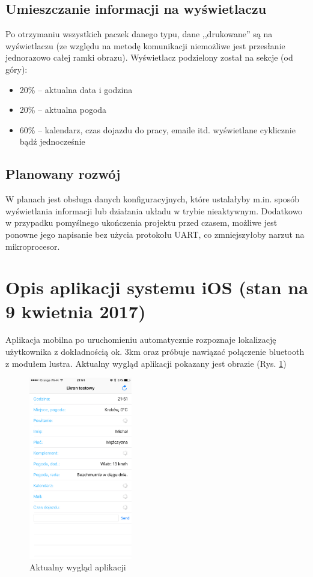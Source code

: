 \documentclass[a4paper,11pt]{article}
\begin{document}
\subsection{Umieszczanie informacji na wyświetlaczu}
Po otrzymaniu wszystkich paczek danego typu, dane ,,drukowane'' są na wyświetlaczu (ze względu na metodę komunikacji niemożliwe jest przesłanie jednorazowo całej ramki obrazu). Wyświetlacz podzielony został na sekcje (od góry):
\begin{itemize}
	\item 20\% -- aktualna data i godzina
	\item 20\% -- aktualna pogoda
	\item 60\% -- kalendarz, czas dojazdu do pracy, emaile itd. wyświetlane cyklicznie bądź jednocześnie
\end{itemize}

\subsection{Planowany rozwój}
W planach jest obsługa danych konfiguracyjnych, które ustalałyby m.in. sposób wyświetlania informacji lub działania układu w trybie nieaktywnym. Dodatkowo w przypadku pomyślnego ukończenia projektu przed czasem, możliwe jest ponowne jego napisanie bez użycia protokołu UART, co zmniejszyłoby narzut na mikroprocesor.

\section{Opis aplikacji systemu iOS (stan na 9 kwietnia 2017)}

Aplikacja mobilna po uruchomieniu automatycznie rozpoznaje lokalizację użytkownika z dokładnością ok. 3km oraz próbuje nawiązać połączenie bluetooth z modułem lustra. Aktualny wygląd aplikacji pokazany jest obrazie (Rys. \ref{ios_main_screen})

\begin{figure}[H]
	\includegraphics[width=0.4\textwidth,center]{ios_main_scrren.png}
	\caption {Aktualny wygląd aplikacji}
	\label{ios_main_screen}
\end{figure}
\end{document}

